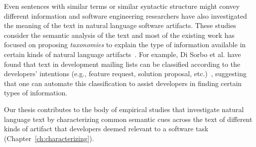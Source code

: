






Even sentences with similar terms or similar syntactic structure might convey different information
and software engineering researchers have also investigated the meaning of the text in natural language software artifacts. 
These studies consider the semantic analysis of the text and most of the existing 
work has focused on proposing \textit{taxonomies} to explain the type of information 
available in certain kinds of natural language artifacts~\cite{Maalej2013, Arya2019}. 
For example, Di Sorbo et al. have found that 
text in development mailing lists can be classified according to the developers' intentions (e.g., feature request, solution proposal, etc.)~\cite{Sorbo2015},
suggesting that one can automate this classification to assist developers in finding 
certain types of information.





Our thesis contributes to the body of empirical studies that investigate natural language 
text by characterizing common semantic cues across the text 
of different kinds of artifact that developers 
deemed relevant to a software task (Chapter~\ref{ch:characterizing}).



















